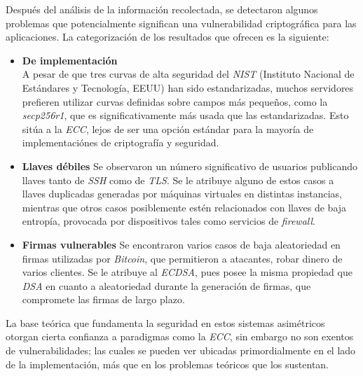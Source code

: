 \documentclass[14pt]{article}
\begin{document}
Después del análisis de la información recolectada, se detectaron algunos problemas que
potencialmente significan una vulnerabilidad criptográfica para las aplicaciones.
La categorización de los resultados que ofrecen es la siguiente:
\begin{itemize}
\item \textbf{De implementación}\\
  A pesar de que tres curvas de alta seguridad del \textit{NIST} (Instituto Nacional de Estándares y Tecnología, EEUU) han sido estandarizadas, muchos servidores prefieren utilizar curvas definidas sobre campos más pequeños, como la \textit{secp256r1}, que es significativamente más usada que las estandarizadas. Esto sitúa a la \textit{ECC}, lejos de ser una opción estándar para la mayoría de implementaciónes de criptografía y seguridad.
\item \textbf{Llaves débiles}
  Se observaron un número significativo de usuarios publicando llaves tanto de \textit{SSH} como de \textit{TLS}. Se le atribuye alguno de estos casos a llaves duplicadas generadas por máquinas virtuales en distintas instancias, mientras que otros casos posiblemente estén relacionados con llaves de baja entropía, provocada por dispositivos tales como servicios de \textit{firewall}.
\item \textbf{Firmas vulnerables}
  Se encontraron varios casos de baja aleatoriedad en firmas utilizadas por \textit{Bitcoin}, que permitieron a atacantes, robar dinero de varios clientes. Se le atribuye al \textit{ECDSA}, pues posee la misma propiedad que \textit{DSA} en cuanto a aleatoriedad durante la generación de firmas, que compromete las firmas de largo plazo.
\end{itemize}

La base teórica que fundamenta la seguridad en estos sistemas asimétricos otorgan cierta confianza a paradigmas como  la \textit{ECC}, sin embargo no son exentos de vulnerabilidades; las cuales se pueden ver ubicadas primordialmente en el lado de la implementación, más que en los problemas teóricos que los sustentan.  
\end{document}

